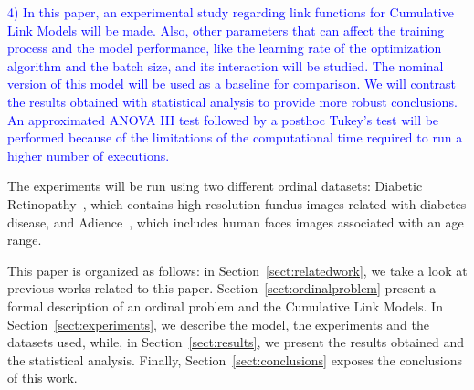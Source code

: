 \documentclass[journal]{IEEEtran}
\begin{document}
	\textcolor{blue}{4) In this paper, an experimental study regarding link functions for Cumulative Link Models will be made. Also, other parameters that can affect the training process and the model performance, like the learning rate of the optimization algorithm and the batch size, and its interaction will be studied. The nominal version of this model will be used as a baseline for comparison. We will contrast the results obtained with statistical analysis to provide more robust conclusions. An approximated ANOVA III \cite{miller1997beyond} test followed by a posthoc Tukey's test \cite{tukey1949comparing} will be performed because of the limitations of the computational time required to run a higher number of executions.}
	
	The experiments will be run using two different ordinal datasets: Diabetic Retinopathy~\cite{de2018weighted}, which contains high-resolution fundus images related with diabetes disease, and Adience~\cite{beckham2017unimodal}, which includes human faces images associated with an age range.
	
	This paper is organized as follows: in Section~\ref{sect:relatedwork}, we take a look at previous works related to this paper. Section~\ref{sect:ordinalproblem} present a formal description of an ordinal problem and the Cumulative Link Models. In Section~\ref{sect:experiments}, we describe the model, the experiments and the datasets used, while, in Section~\ref{sect:results}, we present the results obtained and the statistical analysis. Finally, Section~\ref{sect:conclusions} exposes the conclusions of this work.
	
\end{document}
